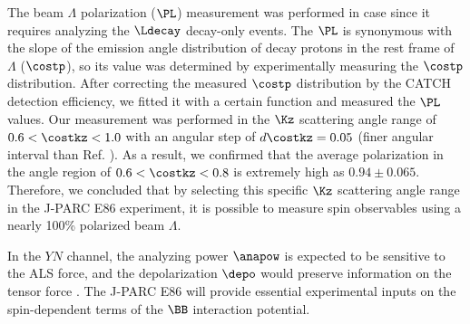 The beam $\Lambda$ polarization ($\PL$) measurement was performed in case  since it requires analyzing the $\Ldecay$ decay-only events. The $\PL$ is synonymous with the slope of the emission angle distribution of decay protons in the rest frame of $\Lambda$ ($\costp$), so its value was determined by experimentally measuring the $\costp$ distribution. After correcting the measured $\costp$ distribution by the CATCH detection efficiency, we fitted it with a certain function and measured the $\PL$ values. Our measurement was performed in the $\Kz$ scattering angle range of $0.6<\costkz<1.0$ with an angular step of $d\costkz=0.05$ (finer angular interval than Ref. \cite{Baker}). As a result, we confirmed that the average polarization in the angle region of $0.6<\costkz<0.8$ is extremely high as $0.94\pm0.065$. Therefore, we concluded that by selecting this specific $\Kz$ scattering angle range in the J-PARC E86 experiment, it is possible to measure spin observables using a nearly 100\% polarized beam $\Lambda$.

In the $YN$ channel, the analyzing power $\anapow$ is expected to be sensitive to the ALS force, and the depolarization $\depo$ would preserve information on the tensor force \cite{Ishikawa-2004}. The J-PARC E86 will provide essential experimental inputs on the spin-dependent terms of the $\BB$ interaction potential.



%
